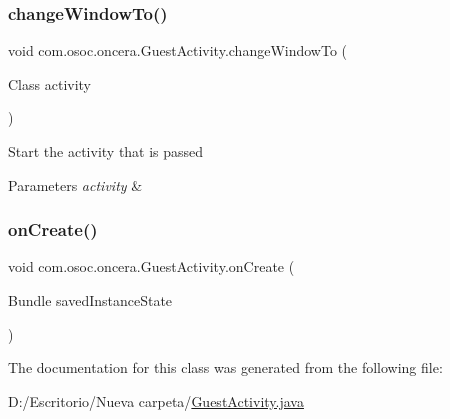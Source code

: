 \subsubsection{\texorpdfstring{changeWindowTo()}{changeWindowTo()}}
{\footnotesize\ttfamily void com.\+osoc.\+oncera.\+Guest\+Activity.\+change\+Window\+To (\begin{DoxyParamCaption}\item[{Class}]{activity }\end{DoxyParamCaption})}

Start the activity that is passed 
\begin{DoxyParams}{Parameters}
{\em activity} & \\
\hline
\end{DoxyParams}
\mbox{\label{classcom_1_1osoc_1_1oncera_1_1_guest_activity_a165acce74d9449a855c0e4c30cd038d0}} 
\subsubsection{\texorpdfstring{onCreate()}{onCreate()}}
{\footnotesize\ttfamily void com.\+osoc.\+oncera.\+Guest\+Activity.\+on\+Create (\begin{DoxyParamCaption}\item[{Bundle}]{saved\+Instance\+State }\end{DoxyParamCaption})\hspace{0.3cm}{\ttfamily [protected]}}



The documentation for this class was generated from the following file\+:\begin{DoxyCompactItemize}
\item 
D\+:/\+Escritorio/\+Nueva carpeta/\mbox{\hyperlink{_guest_activity_8java}{Guest\+Activity.\+java}}\end{DoxyCompactItemize}

